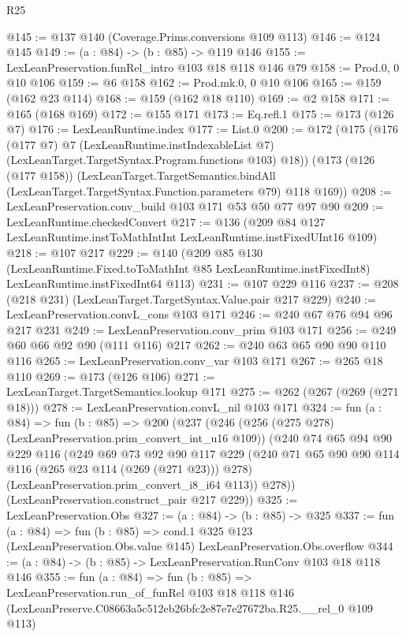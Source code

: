 \begin{lexlean}{R25}
\begin{coremodule}
@145 := @137 @140 (Coverage.Prims.conversions @109 @113)
@146 := @124 @145
@149 := (a : @84) -> (b : @85) -> @119 @146
@155 := LexLeanPreservation.funRel_intro @103 @18 @118 @146 @79
@158 := Prod.{0, 0} @10 @106
@159 := @6 @158
@162 := Prod.mk.{0, 0} @10 @106
@165 := @159 (@162 @23 @114)
@168 := @159 (@162 @18 @110)
@169 := @2 @158
@171 := @165 (@168 @169)
@172 := @155 @171
@173 := Eq.refl.{1}
@175 := @173 (@126 @7)
@176 := LexLeanRuntime.index
@177 := List.{0}
@200 := @172
    (@175
      (@176
        (@177 @7)
        @7
        (LexLeanRuntime.instIndexableList @7)
        (LexLeanTarget.TargetSyntax.Program.functions @103)
        @18))
    (@173
      (@126 (@177 @158))
      (LexLeanTarget.TargetSemantics.bindAll
        (LexLeanTarget.TargetSyntax.Function.parameters @79)
        @118
        @169))
@208 := LexLeanPreservation.conv_build @103 @171 @53 @50 @77 @97 @90
@209 := LexLeanRuntime.checkedConvert
@217 := @136 (@209 @84 @127 LexLeanRuntime.instToMathIntInt LexLeanRuntime.instFixedUInt16 @109)
@218 := @107 @217
@229 := @140
    (@209
      @85
      @130
      (LexLeanRuntime.Fixed.toToMathInt @85 LexLeanRuntime.instFixedInt8)
      LexLeanRuntime.instFixedInt64
      @113)
@231 := @107 @229 @116
@237 := @208 (@218 @231) (LexLeanTarget.TargetSyntax.Value.pair @217 @229)
@240 := LexLeanPreservation.convL_cons @103 @171
@246 := @240 @67 @76 @94 @96 @217 @231
@249 := LexLeanPreservation.conv_prim @103 @171
@256 := @249 @60 @66 @92 @90 (@111 @116) @217
@262 := @240 @63 @65 @90 @90 @110 @116
@265 := LexLeanPreservation.conv_var @103 @171
@267 := @265 @18 @110
@269 := @173 (@126 @106)
@271 := LexLeanTarget.TargetSemantics.lookup @171
@275 := @262 (@267 (@269 (@271 @18)))
@278 := LexLeanPreservation.convL_nil @103 @171
@324 := fun (a : @84) =>
  fun (b : @85) =>
  @200
    (@237
      (@246
        (@256 (@275 @278) (LexLeanPreservation.prim_convert_int_u16 @109))
        (@240
          @74
          @65
          @94
          @90
          @229
          @116
          (@249
            @69
            @73
            @92
            @90
            @117
            @229
            (@240 @71 @65 @90 @90 @114 @116 (@265 @23 @114 (@269 (@271 @23))) @278)
            (LexLeanPreservation.prim_convert_i8_i64 @113))
          @278))
      (LexLeanPreservation.construct_pair @217 @229))
@325 := LexLeanPreservation.Obs
@327 := (a : @84) -> (b : @85) -> @325
@337 := fun (a : @84) =>
  fun (b : @85) =>
  cond.{1} @325 @123 (LexLeanPreservation.Obs.value @145) LexLeanPreservation.Obs.overflow
@344 := (a : @84) -> (b : @85) -> LexLeanPreservation.RunConv @103 @18 @118 @146
@355 := fun (a : @84) =>
  fun (b : @85) =>
  LexLeanPreservation.run_of_funRel
    @103
    @18
    @118
    @146
    (LexLeanPreserve.C08663a5c512eb26bfc2e87e7e27672ba.R25.__rel_0 @109 @113)
\end{coremodule}
\end{lexlean}
